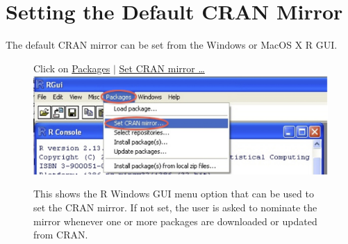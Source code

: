 \section{Setting the Default CRAN Mirror}\label{sec:mirror}
The default CRAN mirror can be set from the Windows or MacOS X R GUI.\\[-3pt]

\begin{figure}[h]
 Click on \underline{Packages} $\mid$ \underline{Set CRAN mirror \ldots}\\[6pt]
\includegraphics{figs-inc/16i-win-mirrors.jpg}
\caption{This shows the R Windows GUI menu option that can be used to
  set the CRAN mirror.  If not set, the user is asked to nominate the
  mirror whenever one or more packages are downloaded or updated from
  CRAN.}
\end{figure}
\vspace*{-18pt}




